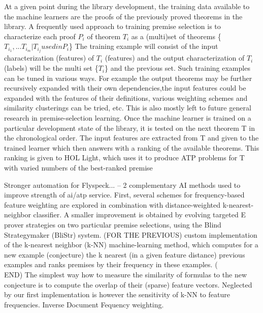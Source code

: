 \documentclass{article}
\begin{document}
At a given point during the library development, the training data available to
the machine learners are the proofs of the previously proved theorems in the
library. A frequently used approach to training premise selection is to
characterize each proof $P_i$ of theorem $T_i$ as a (multi)set of theorems
\{$T_{i_1}, ... T_{i_m}|T_{i_j} used in P_i$\} The training example will
consist of the input characterization (features) of $T_i$ (features) and the
output characterization of $T_i$ (labels) will be the multi set \{$T_i$\} and
the previous set. Such training examples can be tuned in various ways. For
example the output theorems may be further recursively expanded with their own
dependencies,the input features could be expanded with the features of their
definitions, various weighting schemes and similarity clusterings can be tried,
etc. This is also mostly left to future general research in premise-selection
learning. Once the machine learner is trained on a particular development state
of the library, it is tested on the next theorem T in the chronological order.
The input features are extracted from T and given to the trained learner which
then answers with a ranking of the available theorems. This ranking is given to
HOL Light, which uses it to produce ATP problems for T with varied numbers of
the best-ranked premise

Stronger automation for Flyspeck... \cite{FlyspeckFeatW} -- 2 complementary AI
methods used to improve strength of ai/atp service. First, several schemes for
frequency-based feature weighting are explored in combination with
distance-weighted k-nearest-neighbor classifier. A smaller improvement is
obtained by evolving targeted E prover strategies on two particular premise
selections, using the Blind Strategymaker (BliStr) system. (FOR THE PREVIOUS)
custom implementation of the k-nearest neighbor (k-NN) machine-learning method,
which computes for a new example (conjecture) the k nearest (in a given feature
distance) previous examples and ranks premises by their frequency in these
examples. (\\END) The  simplest  way  how  to  measure  the  similarity  of
formulas  to  the  new  conjecture  is  to compute the overlap of their
(sparse) feature vectors. Neglected  by  our  first  implementation  is
however  the  sensitivity  of k-NN  to  feature  frequencies. Inverse Document
Fequency weighting. 
\end{document}
